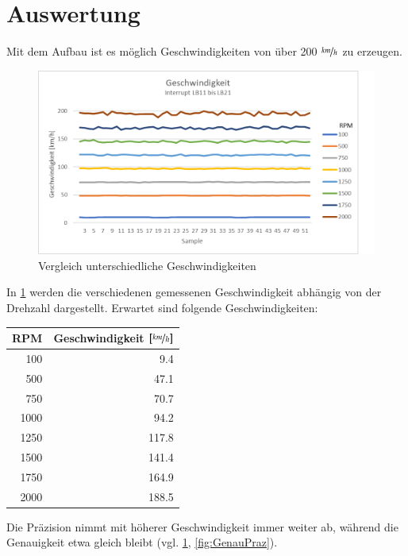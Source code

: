 \section{Auswertung}
Mit dem Aufbau ist es möglich Geschwindigkeiten von über 200 $\nicefrac{km}{h}$ zu erzeugen.

\begin{figure}[ht]
    \centering
    \includegraphics[width=\textwidth]{images/auswertungSpeedUeb.png}
    \caption{Vergleich unterschiedliche Geschwindigkeiten}
    \label{fig:AuswertungSpeed}
\end{figure}

In \ref{fig:AuswertungSpeed} werden die verschiedenen gemessenen Geschwindigkeit abhängig von der Drehzahl dargestellt.
Erwartet sind folgende Geschwindigkeiten:
\begin{center}
    \begin{tabular}{rr}
        \textbf{RPM}&\textbf{Geschwindigkeit $\left[\nicefrac{km}{h}\right]$}\\ \hline
        100&9.4\\
        500&47.1\\
        750&70.7\\
        1000&94.2\\
        1250&117.8\\
        1500&141.4\\
        1750&164.9\\
        2000&188.5\\
    \end{tabular}
\end{center}
 Die Präzision nimmt mit höherer Geschwindigkeit immer weiter ab, während die Genauigkeit etwa gleich bleibt (vgl. \ref{fig:AuswertungSpeed}, \ref{fig:GenauPraz}). 

